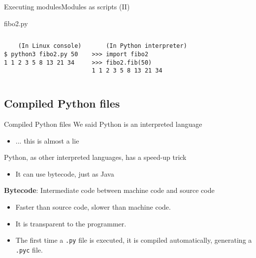 \documentclass[10pt,compress]{beamer} %
\begin{document}
\begin{frame}{Executing modules}{Modules as scripts (II)}
    \small
	\vspace{-0.3cm}
	\begin{exampleblock}{fibo2.py}
	\vspace{-0.2cm}
	
	\vspace{-0.2cm}
	\end{exampleblock}

	\vspace{-0.5cm}
	\begin{columns}
	\begin{exampleblock}{}
	\vspace{-0.2cm}
	\begin{verbatim}
    (In Linux console)
$ python3 fibo2.py 50
1 1 2 3 5 8 13 21 34
\end{verbatim}
	\vspace{-0.2cm}
	\end{exampleblock}

	\begin{exampleblock}{}
	\vspace{-0.2cm}
	\begin{verbatim}
    (In Python interpreter)
>>> import fibo2
>>> fibo2.fib(50)
1 1 2 3 5 8 13 21 34
\end{verbatim}
	\vspace{-0.2cm}
	\end{exampleblock}

    \end{columns}
\end{frame}

\subsection{Compiled Python files}
\begin{frame}{Compiled Python files}{}
	We said Python is an interpreted language
		\begin{itemize}
		\item ... this is almost a lie
		\end{itemize}
	Python, as other interpreted languages, has a speed-up trick
		\begin{itemize}
		\item It can use bytecode, just as Java
		\end{itemize}
	\textbf{Bytecode}: Intermediate code between machine code and source code
		\begin{itemize}
		\item Faster than source code, slower than machine code.
		\item It is transparent to the programmer.
		\item The first time a \texttt{.py} file is executed, it is compiled automatically, generating a \texttt{.pyc} file.
		\end{itemize}
\end{frame}
\end{document}
